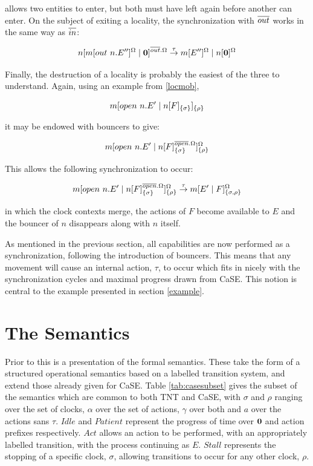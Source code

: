 \noindent allows two entities to enter, but both must have left again
before another can enter.  On the subject of exiting a locality, the
synchronization with $\overline{out}$ works in the same way as $\overline{in}$:

\begin{equation}
{n}[ {m}[ out\ n.E^{\prime \prime} ]^{\Omega} \;|\; \textbf{0} ]^{\overline{out}.\Omega}
 \stackrel{\tau}{\rightarrow}
{m}[ E^{\prime \prime} ]^{\Omega} \;|\; {n}[ \textbf{0} ]^{\Omega}
\end{equation}

Finally, the destruction of a locality is probably the easiest of the
three to understand.  Again, using an example from \ref{locmob},

\begin{equation}
{m}[ open\ n.E^\prime\;|\;{n}[ F ]_{\{\sigma\}} ]_{\{\rho\}}
\end{equation}

\noindent it may be endowed with bouncers to give:

\begin{equation}
{m}[ open\ n.E^\prime \;|\; {n}[ F ]^{\overline{open}.\Omega}_{\{\sigma\}} ]^{\Omega}_{\{\rho\}}
\end{equation}

\noindent This allows the following synchronization to occur:

\begin{equation}
{m}[ open\ n.E^\prime \;|\; {n}[ F ]^{\overline{open}.\Omega}_{\{\sigma\}} ]^{\Omega}_{\{\rho\}}
\stackrel{\tau}{\rightarrow}
{m}[ E^\prime \;|\; {F} ]^{\Omega}_{\{\sigma, \rho\}}
\end{equation}

\noindent in which the clock contexts merge, the actions of $F$ become
available to $E$ and the bouncer of $n$ disappears along with $n$
itself.

As mentioned in the previous section, all capabilities are now performed
as a synchronization, following the introduction of bouncers.  This
means that any movement will cause an internal action, $\tau$, to occur
which fits in nicely with the synchronization cycles and maximal
progress drawn from CaSE.  This notion is central to the example
presented in section \ref{example}.

\section{The Semantics}
\label{tntsemantics}

Prior to this is a presentation of the formal semantics.  These take the
form of a structured operational semantics based on a labelled
transition system, and extend those already given for CaSE.  Table
\ref{tab:casesubset} gives the subset of the semantics which are common
to both TNT and CaSE, with $\sigma$ and $\rho$ ranging over the set of
clocks, $\alpha$ over the set of actions, $\gamma$ over both and $a$
over the actions sans $\tau$. $Idle$ and $Patient$ represent the
progress of time over $\textbf{0}$ and action prefixes respectively.  $Act$
allows an action to be performed, with an appropriately labelled
transition, with the process continuing as $E$.  $Stall$ represents the
stopping of a specific clock, $\sigma$, allowing transitions to occur
for any other clock, $\rho$.

